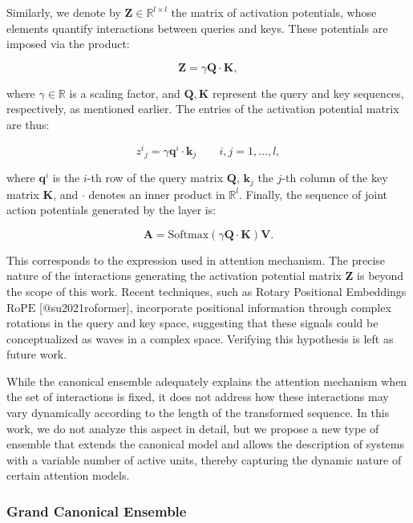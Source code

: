 \documentclass[12pt]{article}
\begin{document}
Similarly, we denote by $\mathbf{Z} \in \mathbb{R}^{l \times l}$ the matrix of activation potentials, whose elements quantify interactions between queries and keys. These potentials are imposed via the product:

\begin{equation}
\mathbf{Z} = \gamma \mathbf{Q} \cdot \mathbf{K},
\end{equation}

where $\gamma \in \mathbb{R}$ is a scaling factor, and $\mathbf{Q}, \mathbf{K}$ represent the query and key sequences, respectively, as mentioned earlier. The entries of the activation potential matrix are thus:

\begin{equation}
z^i{}_j = \gamma \mathbf{q}^i \cdot \mathbf{k}_j \qquad i,j = 1,\dots,l,
\end{equation}

where $\mathbf{q}^i$ is the $i$-th row of the query matrix $\mathbf{Q}$, $\mathbf{k}_j$ the $j$-th column of the key matrix $\mathbf{K}$, and $\cdot$ denotes an inner product in $\mathbb{R}^l$. Finally, the sequence of joint action potentials generated by the layer is:

\begin{equation}
\mathbf{A} = \text{Softmax}(\gamma \mathbf{Q} \cdot \mathbf{K}) \mathbf{V}.
\end{equation}

This corresponds to the expression used in attention mechanism. The precise nature of the interactions generating the activation potential matrix $\mathbf{Z}$ is beyond the scope of this work. Recent techniques, such as Rotary Positional Embeddings $\text{RoPE}$ [@su2021roformer], incorporate positional information through complex rotations in the query and key space, suggesting that these signals could be conceptualized as waves in a complex space. Verifying this hypothesis is left as future work.

While the canonical ensemble adequately explains the attention mechanism when the set of interactions is fixed, it does not address how these interactions may vary dynamically according to the length of the transformed sequence. In this work, we do not analyze this aspect in detail, but we propose a new type of ensemble that extends the canonical model and allows the description of systems with a variable number of active units, thereby capturing the dynamic nature of certain attention models.

\subsubsection{Grand Canonical Ensemble}
\end{document}
